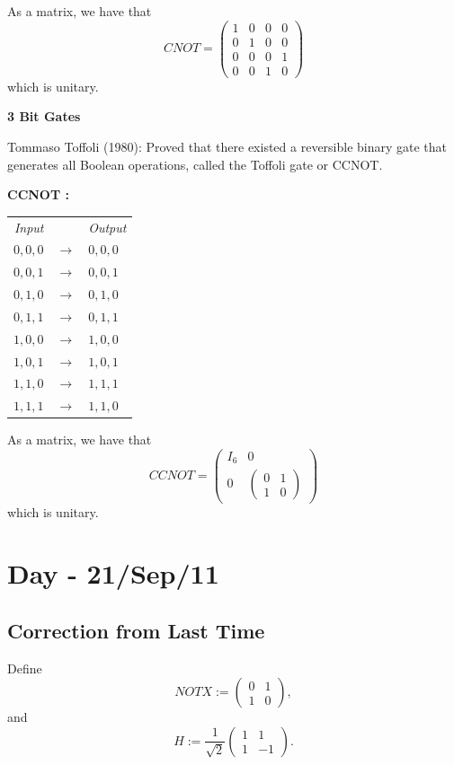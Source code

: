 \documentclass[12pt]{article}
\theoremstyle{definition}
\begin{document}
As a matrix, we have that
\[
CNOT = \begin{pmatrix}
1 & 0 & 0 & 0 \\
0 & 1 & 0 & 0 \\
0 & 0 & 0 & 1 \\
0 & 0 & 1 & 0
\end{pmatrix}
\]
which is unitary.

\begin{center}
\textbf{3 Bit Gates}
\end{center}

Tommaso Toffoli (1980): Proved that there existed a reversible binary gate that generates all Boolean operations, called the Toffoli gate or CCNOT.

\textbf{CCNOT :}
\begin{center}
\begin{tabular}{rcl}
\textit{Input} & & \textit{Output} \\
$0,0,0$ & $\to$ & $0,0,0$ \\
$0,0,1$ & $\to$ & $0,0,1$ \\
$0,1,0$ & $\to$ & $0,1,0$ \\
$0,1,1$ & $\to$ & $0,1,1$ \\
$1,0,0$ & $\to$ & $1,0,0$ \\
$1,0,1$ & $\to$ & $1,0,1$ \\
$1,1,0$ & $\to$ & $1,1,1$ \\
$1,1,1$ & $\to$ & $1,1,0$
\end{tabular}
\end{center}

As a matrix, we have that
\[
CCNOT = \begin{pmatrix}
I_6 & 0 \\
0 & \begin{pmatrix}0&1\\1&0\end{pmatrix}
\end{pmatrix}
\]
which is unitary.


\section{Day - 21/Sep/11}

\subsection{Correction from Last Time}

Define
\[
NOTX := \begin{pmatrix}0&1\\1&0\end{pmatrix},
\]
and
\[
H := \frac{1}{\sqrt{2}}\begin{pmatrix}1&1\\1&-1\end{pmatrix}.
\]
\end{document}
